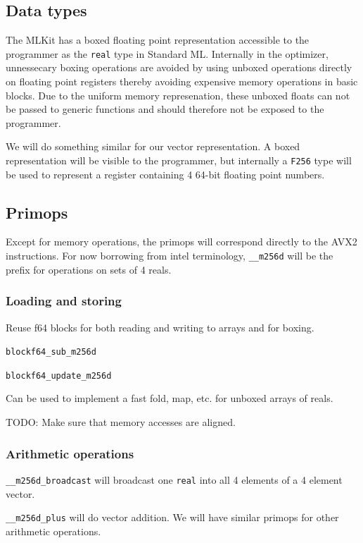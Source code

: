 \documentclass{article}
\begin{document}
\subsection{Data types}

The MLKit has a boxed floating point representation accessible to the programmer as the \verb!real! type in Standard ML. Internally in the optimizer, unnessecary boxing operations are avoided by using unboxed operations directly on floating point registers thereby avoiding expensive memory operations in basic blocks. Due to the uniform memory represenation, these unboxed floats can not be passed to generic functions and should therefore not be exposed to the programmer.

We will do something similar for our vector representation. A boxed representation will be visible to the programmer, but internally a \verb!F256! type will be used to represent a register containing 4 64-bit floating point numbers.

\subsection{Primops}

Except for memory operations, the primops will correspond directly to the AVX2 instructions. For now borrowing from intel terminology, \verb!__m256d! will be the prefix for operations on sets of 4 reals.

\subsubsection{Loading and storing}

Reuse f64 blocks for both reading and writing to arrays and for boxing.

\verb!blockf64_sub_m256d!

\verb!blockf64_update_m256d!

Can be used to implement a fast fold, map, etc. for unboxed arrays of reals.


TODO: Make sure that memory accesses are aligned.

\subsubsection{Arithmetic operations}

\verb!__m256d_broadcast! will broadcast one \verb!real! into all 4 elements of a 4 element vector.

\verb!__m256d_plus! will do vector addition. We will have similar primops for other arithmetic operations.
\end{document}
